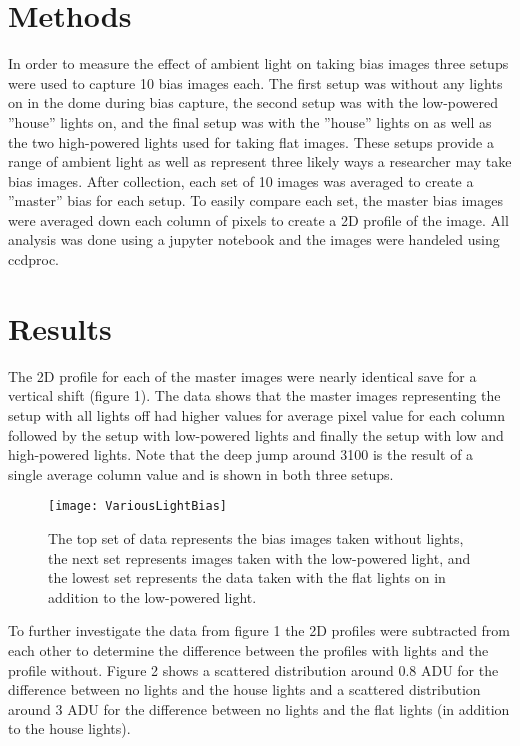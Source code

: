 \documentclass{article}
\begin{document}
\section{Methods}
In order to measure the effect of ambient light on taking bias images three setups were used to capture 10 bias images each. The first setup was without any lights on in the dome during bias capture, the second setup was with the low-powered ''house'' lights on, and the final setup was with the ''house'' lights on as well as the two high-powered lights used for taking flat images. These setups provide a range of ambient light as well as represent three likely ways a researcher may take bias images. After collection, each set of 10 images was averaged to create a ''master'' bias for each setup. To easily compare each set, the master bias images were averaged down each column of pixels to create a 2D profile of the image. All analysis was done using a jupyter notebook and the images were handeled using ccdproc\cite{jupyter16}\cite{ccdproc16}.
\section{Results}
The 2D profile for each of the master images were nearly identical save for a vertical shift (figure 1). The data shows that the master images representing the setup with all lights off had higher values for average pixel value for each column followed by the setup with low-powered lights and finally the setup with low and high-powered lights. Note that the deep jump around 3100 is the result of a single average column value and is shown in both three setups.

\begin{figure}[h]
	\centering
		\texttt{[image: VariousLightBias]}
	\caption{The top set of data represents the bias images taken without lights, the next set represents images taken with the low-powered light, and the lowest set represents the data taken with the flat lights on in addition to the low-powered light.}
\end{figure}

To further investigate the data from figure 1 the 2D profiles were subtracted from each other to determine the difference between the profiles with lights and the profile without. Figure 2 shows a scattered distribution around 0.8 ADU for the difference between no lights and the house lights and a scattered distribution around 3 ADU for the difference between no lights and the flat lights (in addition to the house lights).
\end{document}
